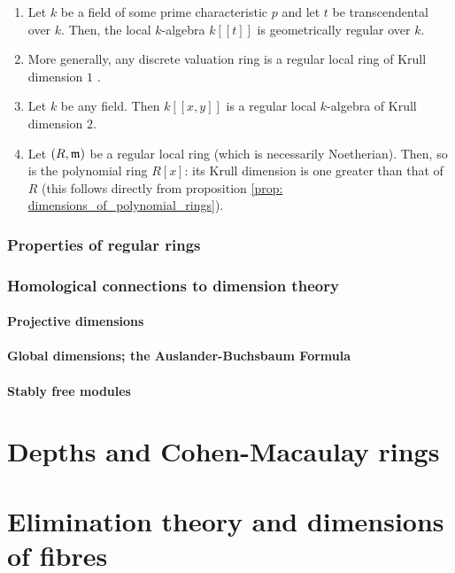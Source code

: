                 \begin{example} \label{example: regular_rings}
                    \noindent
                    \begin{enumerate}
                        \item Let $k$ be a field of some prime characteristic $p$ and let $t$ be transcendental over $k$. Then, the local $k$-algebra $k[\![t]\!]$ is geometrically regular over $k$. 
                        \item More generally, any discrete valuation ring is a regular local ring of Krull dimension $1$ \cite[\href{https://stacks.math.columbia.edu/tag/00PD}{Tag 00PD}]{stacks}.  
                        \item Let $k$ be any field. Then $k[\![x, y]\!]$ is a regular local $k$-algebra of Krull dimension $2$. 
                        \item Let $(R, \mathfrak{m})$ be a regular local ring (which is necessarily Noetherian). Then, so is the polynomial ring $R[x]$: its Krull dimension is one greater than that of $R$ (this follows directly from proposition \ref{prop: dimensions_of_polynomial_rings}).
                    \end{enumerate}
                \end{example}
                
            \subsubsection{Properties of regular rings}
            
            \subsubsection{Homological connections to dimension theory}
                \paragraph{Projective dimensions}
                
                \paragraph{Global dimensions; the Auslander-Buchsbaum Formula}
                
                \paragraph{Stably free modules}
    
    \section{Depths and Cohen-Macaulay rings}
    
    \section{Elimination theory and dimensions of fibres}
